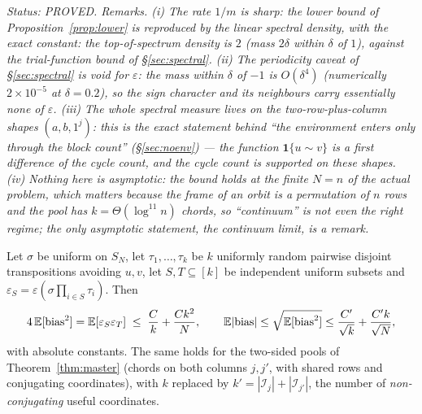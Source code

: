 \emph{Status: PROVED.  Remarks.  (i) The rate $1/m$ is sharp: the
lower bound of Proposition~\ref{prop:lower} is reproduced by the
linear spectral density, with the exact constant: the top-of-spectrum
density is $2$ (mass $2\delta$ within $\delta$ of $1$), against the
trial-function bound of \S\ref{sec:spectral}.  (ii) The periodicity
caveat of \S\ref{sec:spectral} is void for $\varepsilon$: the mass
within $\delta$ of $-1$ is $O(\delta^4)$ (numerically $2\times10^{-5}$
at $\delta=0.2$), so the sign character and its neighbours carry
essentially none of $\varepsilon$.  (iii) The whole spectral measure
lives on the two-row-plus-column shapes $(a,b,1^j)$: this is the
exact statement behind ``the environment enters only through the
block count'' (\S\ref{sec:noenv}) --- the function
$\mathbf 1\{u\sim v\}$ is a first difference of the cycle count, and
the cycle count is supported on these shapes.  (iv) Nothing here is
asymptotic: the bound holds at the finite $N=n$ of the actual
problem, which matters because the frame of an orbit is a
permutation of $n$ rows and the pool has $k=\Theta(\log^{11}n)$
chords, so ``continuum'' is not even the right regime; the only
asymptotic statement, the continuum limit, is a remark.}

\begin{corollary}
\label{cor:stationarymodel}
Let $\sigma$ be uniform on $S_N$, let $\tau_1,\dots,\tau_k$ be $k$
uniformly random pairwise disjoint transpositions avoiding $u,v$, let
$S,T\subseteq[k]$ be independent uniform subsets and
$\varepsilon_S=\varepsilon(\sigma\prod_{i\in S}\tau_i)$.  Then
\[
4\,\mathbb{E}[\mathrm{bias}^2]=\mathbb{E}[\varepsilon_S\varepsilon_T]
\;\le\;\frac{C}{k}+\frac{Ck^2}{N},
\qquad
\mathbb{E}|\mathrm{bias}|\le\sqrt{\mathbb{E}[\mathrm{bias}^2]}\le\frac{C'}{\sqrt k}+\frac{C'k}{\sqrt N},
\]
with absolute constants.  The same holds for the two-sided pools of
Theorem~\ref{thm:master} (chords on both columns $j,j'$, with shared
rows and conjugating coordinates), with $k$ replaced by
$k'=|\mathcal I_j|+|\mathcal I_{j'}|$, the number of
\emph{non-conjugating} useful coordinates.
\end{corollary}

